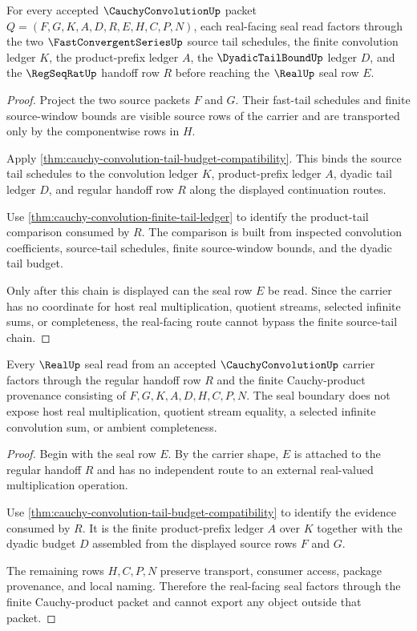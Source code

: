 \begin{theorem}
\label{thm:cauchy-convolution-source-tail-seal-chain}
For every accepted $\CauchyConvolutionUp$ packet $Q=(F,G,K,A,D,R,E,H,C,P,N)$, each real-facing seal read factors through the two $\FastConvergentSeriesUp$ source tail schedules, the finite convolution ledger $K$, the product-prefix ledger $A$, the $\DyadicTailBoundUp$ ledger $D$, and the $\RegSeqRatUp$ handoff row $R$ before reaching the $\RealUp$ seal row $E$.
\end{theorem}
\begin{proof}
Project the two source packets $F$ and $G$. Their fast-tail schedules and finite source-window bounds are visible source rows of the carrier and are transported only by the componentwise rows in $H$.

Apply \autoref{thm:cauchy-convolution-tail-budget-compatibility}. This binds the source tail schedules to the convolution ledger $K$, product-prefix ledger $A$, dyadic tail ledger $D$, and regular handoff row $R$ along the displayed continuation routes.

Use \autoref{thm:cauchy-convolution-finite-tail-ledger} to identify the product-tail comparison consumed by $R$. The comparison is built from inspected convolution coefficients, source-tail schedules, finite source-window bounds, and the dyadic tail budget.

Only after this chain is displayed can the seal row $E$ be read. Since the carrier has no coordinate for host real multiplication, quotient streams, selected infinite sums, or completeness, the real-facing route cannot bypass the finite source-tail chain.
\end{proof}

\begin{theorem}
\label{thm:cauchy-convolution-real-seal-factorization-boundary}
Every $\RealUp$ seal read from an accepted $\CauchyConvolutionUp$ carrier factors through the regular handoff row $R$ and the finite Cauchy-product provenance consisting of $F,G,K,A,D,H,C,P,N$. The seal boundary does not expose host real multiplication, quotient stream equality, a selected infinite convolution sum, or ambient completeness.
\end{theorem}
\begin{proof}
Begin with the seal row $E$. By the carrier shape, $E$ is attached to the regular handoff $R$ and has no independent route to an external real-valued multiplication operation.

Use \autoref{thm:cauchy-convolution-tail-budget-compatibility} to identify the evidence consumed by $R$. It is the finite product-prefix ledger $A$ over $K$ together with the dyadic budget $D$ assembled from the displayed source rows $F$ and $G$.

The remaining rows $H,C,P,N$ preserve transport, consumer access, package provenance, and local naming. Therefore the real-facing seal factors through the finite Cauchy-product packet and cannot export any object outside that packet.
\end{proof}

